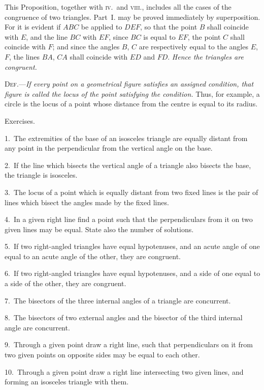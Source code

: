 \documentclass[oneside]{book}
\newcommand\exhead[1]{
\Needspace*{5\baselineskip}\begin{center}
\textsf{#1}
\end{center}
}
\begin{document}
\begin{footnotesize}
This Proposition, together with \textsc{iv.}\ and \textsc{viii}., includes all the
cases of the congruence of two triangles. Part~I. may be proved
immediately by superposition. For it is evident if $ABC$ be applied
to $DEF$, so that the point $B$ shall coincide with $E$, and the line
$BC$ with $EF$, since $BC$ is equal to $EF$, the point $C$ shall coincide
with $F$; and since the angles $B$, $C$ are respectively equal to the
angles $E$, $F$, the lines $BA$, $CA$ shall coincide with $ED$ and $FD$.
\emph{Hence the triangles are congruent.}
\par\end{footnotesize}\bigskip


\textsc{Def.}---\textit{If every point on a geometrical figure satisfies an
assigned condition, that figure is called the locus of the
point satisfying the condition.} Thus, for example, a
circle is the locus of a point whose distance from the
centre is equal to its radius.


\exhead{Exercises.}

\begin{footnotesize}
1.~The extremities of the base of an isosceles triangle are equally
distant from any point in the perpendicular from the vertical angle
on the base.

2.~If the line which bisects the vertical angle of a triangle also
bisects the base, the triangle is isosceles.

3.~The locus of a point which is equally distant from two fixed
lines is the pair of lines which bisect the angles made by the
fixed lines.

4.~In a given right line find a point such that the perpendiculars
from it on two given lines may be equal. State also the number
of solutions.

5.~If two right-angled triangles have equal hypotenuses, and
an acute angle of one equal to an acute angle of the other, they
are congruent.

6.~If two right-angled triangles have equal hypotenuses, and
a side of one equal to a side of the other, they are congruent.

7.~The bisectors of the three internal angles of a triangle are
concurrent.

8.~The bisectors of two external angles and the bisector of the
third internal angle are concurrent.

9.~Through a given point draw a right line, such that perpendiculars
on it from two given points on opposite sides may be
equal to each other.

10.~Through a given point draw a right line intersecting two
given lines, and forming an isosceles triangle with them.
\par\end{footnotesize}
\end{document}
